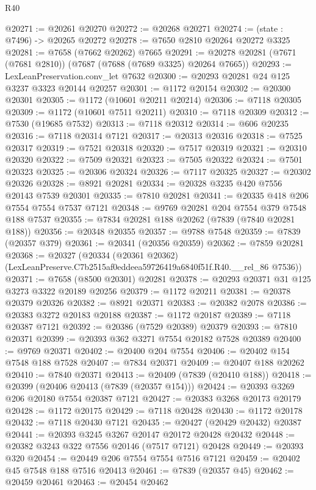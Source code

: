 \begin{lexlean}{R40}
\begin{coremodule}
@20271 := @20261 @20270
@20272 := @20268 @20271
@20274 := (state : @7496) -> @20265 @20272
@20278 := @7650 @2810 @20264 @20272 @3325
@20281 := @7658 (@7662 @20262) @7665
@20291 := @20278 @20281 (@7671 (@7681 @2810)) (@7687 (@7688 (@7689 @3325) @20264 @7665))
@20293 := LexLeanPreservation.conv_let @7632
@20300 := @20293 @20281 @24 @125 @3237 @3323 @20144 @20257
@20301 := @1172 @20154
@20302 := @20300 @20301
@20305 := @1172 (@10601 @20211 @20214)
@20306 := @7118 @20305
@20309 := @1172 (@10601 @7511 @20211)
@20310 := @7118 @20309
@20312 := @7530 (@19685 @7532)
@20313 := @7118 @20312
@20314 := @606 @20235
@20316 := @7118 @20314 @7121
@20317 := @20313 @20316
@20318 := @7525 @20317
@20319 := @7521 @20318
@20320 := @7517 @20319
@20321 := @20310 @20320
@20322 := @7509 @20321
@20323 := @7505 @20322
@20324 := @7501 @20323
@20325 := @20306 @20324
@20326 := @7117 @20325
@20327 := @20302 @20326
@20328 := @8921 @20281
@20334 := @20328 @3235 @420 @7556 @20143 @7539 @20301
@20335 := @7810 @20281
@20341 := @20335 @418 @206 @7554 @7554 @7537 @7121
@20348 := @9769 @20281 @204 @7554 @379 @7548 @188 @7537
@20355 := @7834 @20281 @188 @20262 (@7839 (@7840 @20281 @188))
@20356 := @20348 @20355
@20357 := @9788 @7548
@20359 := @7839 (@20357 @379)
@20361 := @20341 (@20356 @20359)
@20362 := @7859 @20281
@20368 := @20327
    (@20334 (@20361 @20362) (LexLeanPreserve.C7b2515af0eddeea59726419a6840f51f.R40.__rel_86 @7536))
@20371 := @7658 (@8500 @20301) @20281
@20378 := @20293 @20371 @31 @125 @3273 @3322 @20189 @20256
@20379 := @1172 @20211
@20381 := @20378 @20379 @20326
@20382 := @8921 @20371
@20383 := @20382 @2078
@20386 := @20383 @3272 @20183 @20188
@20387 := @1172 @20187
@20389 := @7118 @20387 @7121
@20392 := @20386 (@7529 @20389) @20379
@20393 := @7810 @20371
@20399 := @20393 @362 @3271 @7554 @20182 @7528 @20389
@20400 := @9769 @20371
@20402 := @20400 @204 @7554
@20406 := @20402 @154 @7548 @188 @7528
@20407 := @7834 @20371
@20409 := @20407 @188 @20262
@20410 := @7840 @20371
@20413 := @20409 (@7839 (@20410 @188))
@20418 := @20399 (@20406 @20413 (@7839 (@20357 @154)))
@20424 := @20393 @3269 @206 @20180 @7554 @20387 @7121
@20427 := @20383 @3268 @20173 @20179
@20428 := @1172 @20175
@20429 := @7118 @20428
@20430 := @1172 @20178
@20432 := @7118 @20430 @7121
@20435 := @20427 (@20429 @20432) @20387
@20441 := @20393 @3245 @3267 @20147 @20172 @20428 @20432
@20448 := @20382 @3243 @322 @7556 @20146 (@7517 @7121) @20428
@20449 := @20393 @320
@20454 := @20449 @206 @7554 @7554 @7516 @7121
@20459 := @20402 @45 @7548 @188 @7516 @20413
@20461 := @7839 (@20357 @45)
@20462 := @20459 @20461
@20463 := @20454 @20462

\end{coremodule}
\end{lexlean}
